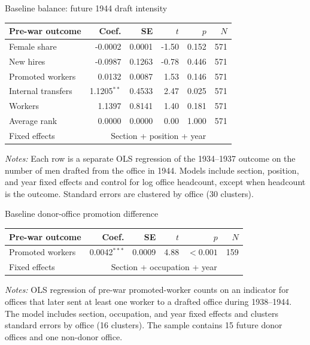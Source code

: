 \documentclass[handout,aspectratio=169]{beamer}
\begin{document}
\begin{frame}[t]{Baseline balance: future 1944 draft intensity}
\centering\scriptsize
\begin{tabular}{lrrrrr}\toprule
Pre-war outcome & Coef. & SE & $t$ & $p$ & $N$\\\midrule
Female share & -0.0002 & 0.0001 & -1.50 & 0.152 & 571\\
New hires & -0.0987 & 0.1263 & -0.78 & 0.446 & 571\\
Promoted workers & 0.0132 & 0.0087 & 1.53 & 0.146 & 571\\
Internal transfers & 1.1205$^{**}$ & 0.4533 & 2.47 & 0.025 & 571\\
Workers & 1.1397 & 0.8141 & 1.40 & 0.181 & 571\\
Average rank & 0.0000 & 0.0000 & 0.00 & 1.000 & 571\\
\midrule
Fixed effects & \multicolumn{5}{c}{Section + position + year} \\\bottomrule
\end{tabular}
\vspace{0.5em}\raggedright
{\tiny \textit{Notes:} Each row is a separate OLS regression of the 1934--1937 outcome on the number of men drafted from the office in 1944. Models include section, position, and year fixed effects and control for log office headcount, except when headcount is the outcome. Standard errors are clustered by office (30 clusters).}
\end{frame}
\begin{frame}[t]{Baseline donor-office promotion difference}
\centering\vspace{1em}
\begin{tabular}{lrrrrr}\toprule
Pre-war outcome & Coef. & SE & $t$ & $p$ & $N$\\\midrule
Promoted workers & 0.0042$^{***}$ & 0.0009 & 4.88 & $<0.001$ & 159\\
\midrule
Fixed effects & \multicolumn{5}{c}{Section + occupation + year} \\\bottomrule
\end{tabular}
\vspace{0.7em}\raggedright
{\tiny \textit{Notes:} OLS regression of pre-war promoted-worker counts on an indicator for offices that later sent at least one worker to a drafted office during 1938--1944. The model includes section, occupation, and year fixed effects and clusters standard errors by office (16 clusters). The sample contains 15 future donor offices and one non-donor office.}
\end{frame}
\end{document}
